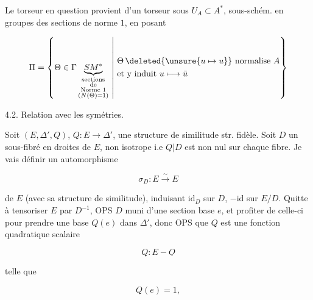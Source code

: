 
 Le torseur en question provient d'un torseur \inserted{$\Pi$} sous  $U_A\subset A^*$, sous-schém. en groupes des sections de norme $1$, en posant

\[
\Pi=\left\{\Theta\in\Gamma\underbrace{SM^{*}}_{\substack{\text{sections}\\\text{de}\\\text{Norme }1\\(N(\Theta)=1)}}\ \middle|\ \begin{aligned}&\Theta\,\deleted{\unsure{u\mapsto u}}\ \text{normalise }A\\&\text{et y induit }u\longmapsto\bar u\end{aligned}\right\}
\]

4.2. Relation avec les symétries.

Soit $(E,\Delta',Q)$, $Q:E\longrightarrow\Delta'$, une structure de similitude str. fidèle. Soit $D$ un sous-fibré en droites de $E$,  non isotrope i.e $Q|D$ est non nul sur chaque fibre. Je vais définir un automorphisme

\[
\sigma_D:E\xrightarrow{\sim}E
\]

de $E$ (avec sa structure de similitude), induisant $\mathrm{id}_D$ sur $D$, $-\mathrm{id}$ sur $E/D$. Quitte à tensoriser $E$ par $D^{-1}$, OPS $D$ muni d'une section base $e$, et profiter de celle-ci pour prendre une base $Q(e)$ dans $\Delta'$, donc OPS que $Q$ est  une fonction quadratique scalaire

\[
Q:E\mathbin{-}\underline O
\]

telle que

\[
Q(e)=1,
\]

